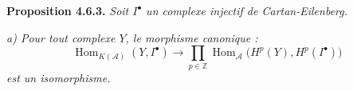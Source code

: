 \medskip\noindent\textbf{Proposition 4.6.3.}\quad
\textit{Soit $I^\bullet$ un complexe injectif de Cartan-Eilenberg.}

\noindent\textit{a) Pour tout complexe $Y$, le morphisme canonique :}
\[
\operatorname{Hom}_{K(\mathcal A)}(Y,I^\bullet)
\longrightarrow
\prod_{p\in\mathbb Z}
\operatorname{Hom}_{\mathcal A}\bigl(H^p(Y),H^p(I^\bullet)\bigr)
\]
\textit{est un isomorphisme.}
\endgroup
